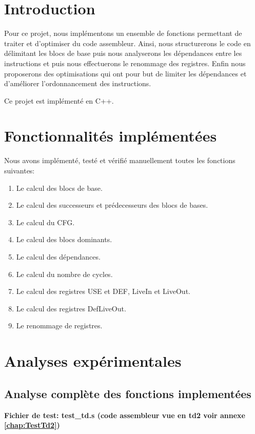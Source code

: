 \documentclass[11pt, openany]{article}
\begin{document}
\newpage

\section{Introduction}
Pour ce projet, nous implémentons un ensemble de fonctions permettant de traiter et d'optimiser du code assembleur. Ainsi, nous structurerons le
code en délimitant les blocs de base puis nous analyserons les
dépendances entre les instructions et puis nous effectuerons le renommage des registres. Enfin nous proposerons des optimisations qui ont pour but de limiter les dépendances et d'améliorer l’ordonnancement des instructions.

Ce projet est implémenté en C++.

\section{Fonctionnalités implémentées}

Nous avons implémenté, testé et vérifié manuellement toutes les fonctions suivantes:

\begin{enumerate}
    \item Le calcul des blocs de base.
    \item Le calcul des successeurs et prédecesseurs des blocs de bases.
    \item Le calcul du CFG.
    \item Le calcul des blocs dominants.
    \item Le calcul des dépendances.
    \item Le calcul du nombre de cycles.
    \item Le calcul des registres USE et DEF, LiveIn et LiveOut.
    \item Le calcul des registres DefLiveOut.
    \item Le renommage de registres.
\end{enumerate}

\section{Analyses expérimentales}
\subsection{Analyse complète des fonctions implementées}
\textbf{Fichier de test: test\_td.s (code assembleur vue en td2 voir annexe \ref{chap:TestTd2}) }
\end{document}
